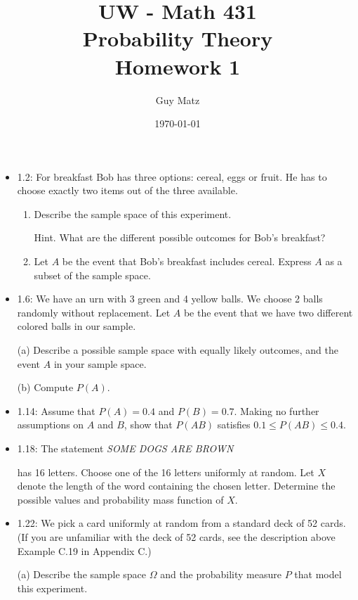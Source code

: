 \documentclass[10pt]{article}
\title{UW - Math 431 \\
Probability Theory \\
Homework 1}
\author{Guy Matz}
\date{\today}
\begin{document}
\maketitle

\begin{itemize}

\item 1.2: For breakfast Bob has three options: cereal, eggs or fruit. He has to choose exactly two items out of the three available.

\begin{enumerate}
  \item  Describe the sample space of this experiment.

Hint. What are the different possible outcomes for Bob's breakfast?

  \item  Let $A$ be the event that Bob's breakfast includes cereal. Express $A$ as a subset of the sample space.

\end{enumerate}

\item 1.6: We have an urn with 3 green and 4 yellow balls. We choose 2 balls randomly without replacement. Let $A$ be the event that we have two different colored balls in our sample.

(a) Describe a possible sample space with equally likely outcomes, and the event $A$ in your sample space.

(b) Compute $P(A)$.

\item 1.14: Assume that $P(A)=0.4$ and $P(B)=0.7$. Making no further assumptions on $A$ and $B$, show that $P(A B)$ satisfies $0.1 \leq P(A B) \leq 0.4$.

\item 1.18: The statement \textit{SOME DOGS ARE BROWN}

has 16 letters. Choose one of the 16 letters uniformly at random. Let $X$ denote the length of the word containing the chosen letter. Determine the possible values and probability mass function of $X$.

\item 1.22: We pick a card uniformly at random from a standard deck of 52 cards. (If you are unfamiliar with the deck of 52 cards, see the description above Example C.19 in Appendix C.)

(a) Describe the sample space $\Omega$ and the probability measure $P$ that model this experiment.


\end{itemize}
\end{document}
